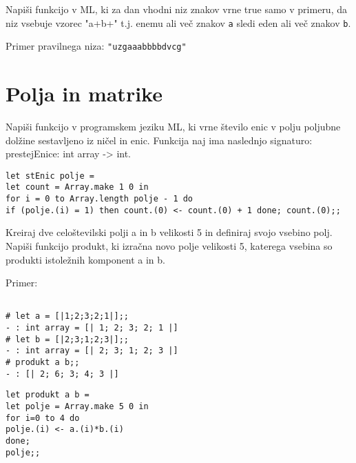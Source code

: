 \begin{ex}
Napi\v si funkcijo v ML, ki za dan vhodni niz znakov vrne true samo v primeru, da niz vsebuje vzorec "a+b+" t.j. enemu ali ve\v c znakov \lstinline{a} sledi eden ali ve\v c znakov \lstinline{b}.

Primer pravilnega niza: \lstinline{"uzgaaabbbbdvcg"}

\end{ex}





\section{Polja in matrike}




\begin{ex}
Napi\v si funkcijo v programskem jeziku ML, ki vrne \v stevilo enic v polju poljubne dol\v zine sestavljeno iz ni\v cel in enic. Funkcija naj ima naslednjo signaturo: prestejEnice: int array -> int.

\begin{sol}
\begin{lstlisting}
let stEnic polje = 
let count = Array.make 1 0 in
for i = 0 to Array.length polje - 1 do 
if (polje.(i) = 1) then count.(0) <- count.(0) + 1 done; count.(0);;
\end{lstlisting}
\end{sol}
\end{ex}




\begin{ex}
Kreiraj dve celo\v stevilski polji a in b velikosti 5 in definiraj svojo vsebino polj. Napi\v si funkcijo produkt, ki izra\v cna novo polje velikosti 5, katerega vsebina so produkti istole\v znih komponent a in b.

Primer: \begin{lstlisting}

# let a = [|1;2;3;2;1|];;
- : int array = [| 1; 2; 3; 2; 1 |]
# let b = [|2;3;1;2;3|];;
- : int array = [| 2; 3; 1; 2; 3 |]
# produkt a b;; 
- : [| 2; 6; 3; 4; 3 |]
\end{lstlisting}

\begin{sol}
\begin{lstlisting}
let produkt a b = 
let polje = Array.make 5 0 in
for i=0 to 4 do
polje.(i) <- a.(i)*b.(i)
done;
polje;;
\end{lstlisting}
\end{sol}
\end{ex}




